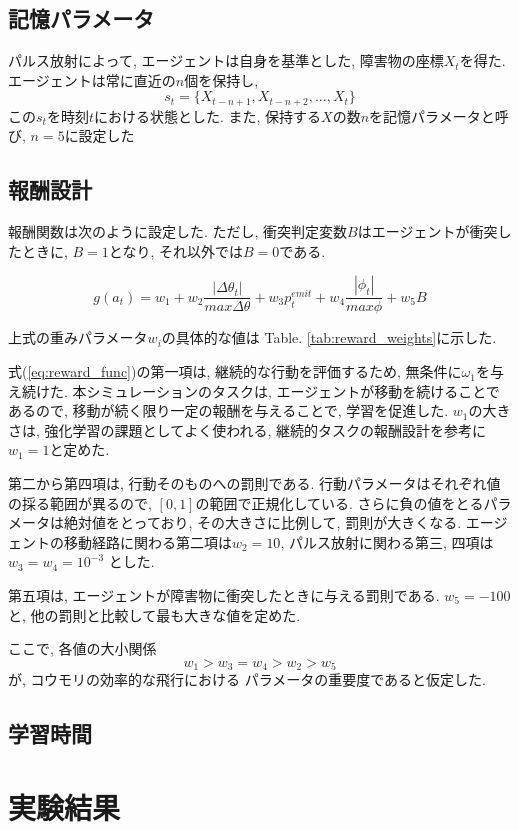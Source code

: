 \documentclass[../main]{subfiles}
\begin{document}
\subsection{記憶パラメータ}
パルス放射によって, エージェントは自身を基準とした, 
障害物の座標$X_t$を得た. 
エージェントは常に直近の$n$個を保持し, 
$$
s_t = \{X_{t-n+1}, X_{t-n+2}, ..., X_t\}
$$
この$s_t$を時刻$t$における状態とした.
また, 保持する$X$の数$n$を記憶パラメータと呼び, 
$n=5$に設定した

\subsection{報酬設計}
報酬関数は次のように設定した. 
ただし, 衝突判定変数$B$はエージェントが衝突したときに, $B=1$となり, 
それ以外では$B=0$である.

\begin{equation}
\label{eq:reward_func}
 g(a_t) = 
w_1 +
w_2 \frac{|\Delta\theta_t|}{max \Delta\theta} +
w_3 p^{emit}_t +
w_4 \frac{|\phi_t|}{max \phi} +
w_5 B
\end{equation}

上式の重みパラメータ$w_i$の具体的な値は
Table. \ref{tab:reward_weights}に示した.

式(\ref{eq:reward_func})の第一項は, 
継続的な行動を評価するため, 無条件に$\omega_1$を与え続けた.
本シミュレーションのタスクは, 
エージェントが移動を続けることであるので, 
移動が続く限り一定の報酬を与えることで, 学習を促進した.
$w_1$の大きさは, 強化学習の課題としてよく使われる, 
継続的タスクの報酬設計を参考に$w_1=1$と定めた.

第二から第四項は, 行動そのものへの罰則である.
行動パラメータはそれぞれ値の採る範囲が異るので, 
$[0, 1]$の範囲で正規化している.
さらに負の値をとるパラメータは絶対値をとっており, 
その大きさに比例して, 罰則が大きくなる.
エージェントの移動経路に関わる第二項は$w_2=10$, 
パルス放射に関わる第三, 四項は$w_3=w_4=10^{-3}$
とした.

第五項は, エージェントが障害物に衝突したときに与える罰則である.
$w_5=-100$と, 他の罰則と比較して最も大きな値を定めた.

ここで, 各値の大小関係
$$
w_1>w_3=w_4>w_2>w_5
$$
が, コウモリの効率的な飛行における
パラメータの重要度であると仮定した.

\subsection{学習時間}


\section{実験結果}
\end{document}
